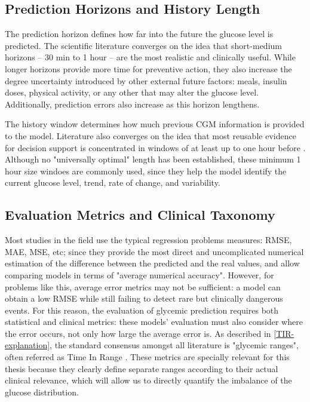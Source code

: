 \subsection{Prediction Horizons and History Length}
\label{subsec:soa_prediction_horizons_and_history}

The prediction horizon defines how far into the future the glucose level is predicted. The scientific literature \cite{WOLDAREGAY2019109, info:doi/10.2196/34699, s26092675, 10.1371/journal.pone.0253125} converges on the idea that short-medium horizons -- 30 min to 1 hour -- are the most realistic and clinically useful. While longer horizons provide more time for preventive action, they also increase the degree uncertainty introduced by other external future factors: meals, insulin doses, physical activity, or any other that may alter the glucose level. Additionally, prediction errors also increase as this horizon lengthens.

The history window determines how much previous CGM information is provided to the model. Literature also converges on the idea that most reusable evidence for decision support is concentrated in windows of at least up to one hour before \cite{WOLDAREGAY2019109, info:doi/10.2196/34699, s26092675, 10.1371/journal.pone.0253125}. Although no "universally optimal" length has been established, these minimum 1 hour size windoes are commonly used, since they help the model identify the current glucose level, trend, rate of change, and variability.

\subsection{Evaluation Metrics and Clinical Taxonomy}
\label{subsec:soa_clinical_metrics}

Most studies \cite{WOLDAREGAY2019109} in the field use the typical regression problems measures: RMSE, MAE, MSE, etc; since they provide the most direct and uncomplicated numerical estimation of the difference between the predicted and the real values, and allow comparing models in terms of "average numerical accuracy". However, for problems like this, average error metrics may not be sufficient: a model can obtain a low RMSE while still failing to detect rare but clinically dangerous events. For this reason, the evaluation of glycemic prediction requires both statistical and clinical metrics: these models' evaluation must also consider where the error occurs, not only how large the average error is. As described in \ref{TIR-explanation}, the standard consensus amongst all literature is "glycemic ranges", often referred as Time In Range \cite{10.2337/dci19-0028}. These metrics are specially relevant for this thesis because they clearly define separate ranges according to their actual clinical relevance, which will allow us to directly quantify the imbalance of the glucose distribution.

